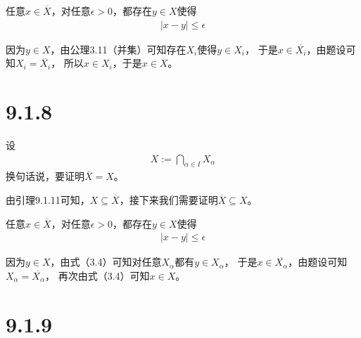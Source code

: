 \documentclass{article}
\begin{document}
任意$x \in \overline{X}$，对任意$\epsilon > 0$，都存在$y \in X$使得
\begin{align*}
      |x - y| \leq \epsilon
\end{align*}

因为$y \in X$，由公理3.11（并集）可知存在$X_i$使得$y \in X_i$，
于是$x \in \overline{X_i}$，由题设可知$X_i = \overline{X_i}$，
所以$x \in X_i$，于是$x \in X$。

\section*{9.1.8}

设
\begin{align*}
      X := \bigcap \limits_{\alpha \in I} X_{\alpha}
\end{align*}
换句话说，要证明$\overline{X} = X$。

由引理9.1.11可知，$X \subseteq \overline{X}$，接下来我们需要证明$\overline{X} \subseteq X$。

任意$x \in \overline{X}$，对任意$\epsilon > 0$，都存在$y \in X$使得
\begin{align*}
      |x - y| \leq \epsilon
\end{align*}

因为$y \in X$，由式（3.4）可知对任意$X_{\alpha}$都有$y \in X_{\alpha}$，
于是$x \in \overline{X_{\alpha}}$，由题设可知$X_{\alpha} = \overline{X_{\alpha}}$，
再次由式（3.4）可知$x \in X$。

\section*{9.1.9}
\end{document}
